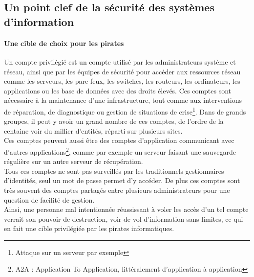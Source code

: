 \subsection{Un point clef de la sécurité des systèmes d'information}

\paragraph{Une cible de choix pour les pirates}
Un compte privilégié est un compte utilisé par les administrateurs système et réseau, ainsi que par les équipes de sécurité pour accéder aux ressources réseau comme les serveurs, les pare-feux, les switches, les routeurs, les ordinateurs, les applications ou les base de données avec des droits élevés. Ces comptes sont nécessaire à la maintenance d'une infrastructure, tout comme aux interventions de réparation, de diagnostique ou gestion de situations de crise\footnote{Attaque sur un serveur par exemple}. Dans de grands groupes, il peut y avoir un grand nombre de ces comptes, de l'ordre de la centaine voir du millier d'entités, réparti sur plusieurs sites.\\
Ces comptes peuvent aussi être des comptes d'application communicant avec d'autres applications\footnote{A2A : Application To Application, littéralement d'application à application}, comme par exemple un serveur faisant une sauvegarde régulière sur un autre serveur de récupération.\\
Tous ces comptes ne sont pas surveillés par les traditionnels gestionnaires d'identités, seul un mot de passe permet d'y accéder. De plus ces comptes sont très souvent des comptes partagés entre plusieurs administrateurs pour une question de facilité de gestion.\\
Ainsi, une personne mal intentionnée réussissant à voler les accès d'un tel compte verrait son pouvoir de destruction, voir de vol d'information sans limites, ce qui en fait une cible privilégiée par les pirates informatiques.

